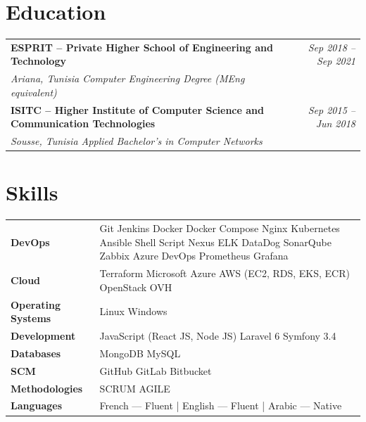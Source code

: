 \documentclass[a4paper,10pt]{article}
\begin{document}
\section{Education}
\begin{tabularx}{\linewidth}{@{}X r@{}}
  {\small\bfseries ESPRIT – Private Higher School of Engineering and Technology} &
  {\footnotesize\itshape\color{cvgray} Sep 2018 – Sep 2021} \\
  {\footnotesize\itshape\color{cvgray} Ariana, Tunisia \textemdash{} Computer Engineering Degree (MEng equivalent)} & \\[3pt]
  {\small\bfseries ISITC – Higher Institute of Computer Science and Communication Technologies} &
  {\footnotesize\itshape\color{cvgray} Sep 2015 – Jun 2018} \\
  {\footnotesize\itshape\color{cvgray} Sousse, Tunisia \textemdash{} Applied Bachelor's in Computer Networks} & \\
\end{tabularx}

\section{Skills}
\begin{tabularx}{\linewidth}{@{}p{3.8cm} X@{}}
  {\small\bfseries DevOps} &
  {\small Git \textbar{} Jenkins \textbar{} Docker \textbar{} Docker Compose \textbar{} Nginx \textbar{}
    Kubernetes \textbar{} Ansible \textbar{} Shell Script \textbar{} Nexus \textbar{} ELK \textbar{}
    DataDog \textbar{} SonarQube \textbar{} Zabbix \textbar{} Azure DevOps \textbar{} Prometheus \textbar{} Grafana} \\[2pt]
  {\small\bfseries Cloud} &
  {\small Terraform \textbar{} Microsoft Azure \textbar{} AWS (EC2, RDS, EKS, ECR) \textbar{} OpenStack \textbar{} OVH} \\[2pt]
  {\small\bfseries Operating Systems} &
  {\small Linux \textbar{} Windows} \\[2pt]
  {\small\bfseries Development} &
  {\small JavaScript (React JS, Node JS) \textbar{} Laravel 6 \textbar{} Symfony 3.4} \\[2pt]
  {\small\bfseries Databases} &
  {\small MongoDB \textbar{} MySQL} \\[2pt]
  {\small\bfseries SCM} &
  {\small GitHub \textbar{} GitLab \textbar{} Bitbucket} \\[2pt]
  {\small\bfseries Methodologies} &
  {\small SCRUM \textbar{} AGILE} \\[2pt]
  {\small\bfseries Languages} &
  {\small French — Fluent \;|\; English — Fluent \;|\; Arabic — Native} \\
\end{tabularx}
\end{document}
